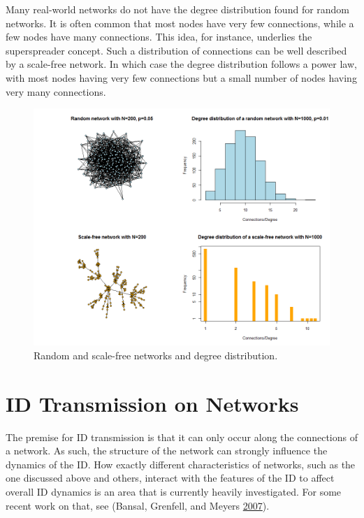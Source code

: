 \documentclass[]{book}
\theoremstyle{definition}
\theoremstyle{definition}
\theoremstyle{definition}
\theoremstyle{remark}
\begin{document}
Many real-world networks do not have the degree distribution found for
random networks. It is often common that most nodes have very few
connections, while a few nodes have many connections. This idea, for
instance, underlies the superspreader concept. Such a distribution of
connections can be well described by a scale-free network. In which case
the degree distribution follows a power law, with most nodes having very
few connections but a small number of nodes having very many
connections.

\begin{figure}
\centering
\includegraphics{./images/network-examples.png}
\caption{\label{fig:network-examples}Random and scale-free networks and
degree distribution.}
\end{figure}

\section{ID Transmission on Networks}\label{id-transmission-on-networks}

The premise for ID transmission is that it can only occur along the
connections of a network. As such, the structure of the network can
strongly influence the dynamics of the ID. How exactly different
characteristics of networks, such as the one discussed above and others,
interact with the features of the ID to affect overall ID dynamics is an
area that is currently heavily investigated. For some recent work on
that, see (Bansal, Grenfell, and Meyers
\protect\hyperlink{ref-bansal07}{2007}).
\end{document}
